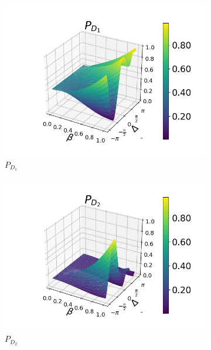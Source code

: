 \documentclass[12pt]{book}
\begin{document}
\begin{figure}[H]
\centering
\begin{subfigure}[b]{0.45\linewidth}
\includegraphics[width=\linewidth]{images/pd1_3.png}
\caption{$P_{D_{1}}$}
\end{subfigure}
\begin{subfigure}[b]{0.45\linewidth}
\includegraphics[width=\linewidth]{images/pd2_3.png}
\caption{$P_{D_{2}}$ }
\label{fig:BS1}
\end{subfigure}
\begin{subfigure}[b]{0.45\linewidth}

\end{subfigure}
\end{figure}
\end{document}

